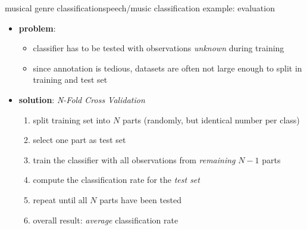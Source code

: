         \begin{frame}{musical genre classification}{speech/music classification example: evaluation}
            \begin{itemize}
                \item 
                    \textbf{problem}: 
                        \begin{itemize}
                            \item   classifier has to be tested with observations \textit{unknown} during training
                            \item   since annotation is tedious, datasets are often not large enough to split in training and test set
                        \end{itemize}
                \item<2-> 	\textbf{solution}: \textit{N-Fold Cross Validation}
                    \begin{enumerate}
                        \item	split training set into $N$ parts (randomly, but identical number per class)
                        \item<3->	select one part as test set
                        \item<4->	train the classifier with all observations from \textit{remaining} $N-1$ parts
                        \item<5->	compute the classification rate for the \textit{test set}
                        \item<6->	repeat until all $N$ parts have been tested
                        \item<7->	overall result: \textit{average} classification rate
                    \end{enumerate}
            \end{itemize}
        \end{frame}

